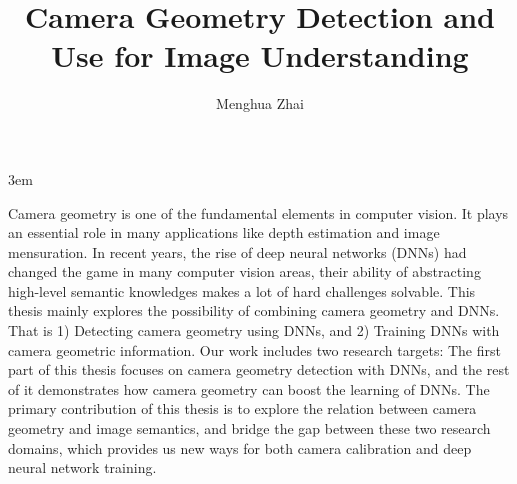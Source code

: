 \documentclass[final]{ukthesis}
\newcommand{\disstitle}{Camera Geometry Detection and Use for Image
Understanding}
\begin{document}
\emergencystretch 3em

\author{Menghua Zhai}
\title{\disstitle}

\abstract
{
  \SingleSpacing
  Camera geometry is one of the fundamental elements in computer vision.
  It plays an essential role in many applications like depth estimation
  and image mensuration. 
  In recent years, the rise of deep neural networks (DNNs) had changed
  the game in many computer vision areas, their ability of abstracting
  high-level semantic knowledges makes a lot of hard challenges
  solvable. 
  This thesis mainly explores the possibility of combining camera
  geometry and DNNs. That is 1) Detecting camera geometry using DNNs,
  and 2) Training DNNs with camera geometric information.  Our work
  includes two research targets: The first part of this thesis focuses
  on camera geometry detection with DNNs, and the rest of it
  demonstrates how camera geometry can boost the learning of DNNs.
  The primary contribution of this thesis is to explore the relation
  between camera geometry and image semantics, and bridge the gap
  between these two research domains, which provides us new ways for
  both camera calibration and deep neural network training.
}


\frontmatter
\maketitle



\tableofcontents\clearpage

\mainmatter


\backmatter




\end{document}
